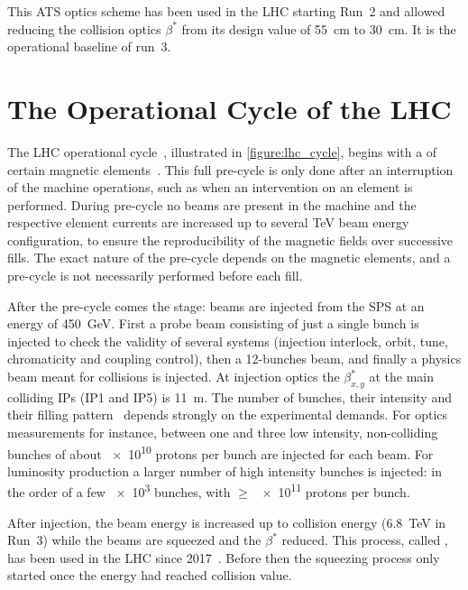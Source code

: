 This ATS optics scheme has been used in the LHC starting Run~\num{2} and allowed reducing the collision optics \(\beta^{\ast}\) from its design value of \qty{55}{\centi\meter} to \qty{30}{\centi\meter}.
It is the operational baseline of \Gls{run}~\num{3}.

\section{The Operational Cycle of the LHC}
\label{section:lhc_operational_cycle}

The \gls{LHC} operational cycle~\cite{Report:LHCModes}, illustrated in \cref{figure:lhc_cycle}, begins with a  of certain magnetic elements~\cite{Report:LHCMagnetsPreCycles}.
This full pre-cycle is only done after an interruption of the machine operations, such as when an intervention on an element is performed.
During pre-cycle no beams are present in the machine and the respective element currents are increased up to several \unit{\tera\electronvolt} beam energy configuration, to ensure the reproducibility of the magnetic fields over successive fills.
The exact nature of the pre-cycle depends on the magnetic elements, and a pre-cycle is not necessarily performed before each fill.

After the pre-cycle comes the  stage: beams are injected from the \gls{SPS} at an energy of \qty{450}{\giga\electronvolt}.
First a probe beam consisting of just a single bunch is injected to check the validity of several systems (injection interlock, orbit, tune, chromaticity and coupling control), then a \num{12}-bunches beam, and finally a physics beam meant for collisions is injected.
At injection optics the \(\beta^{\ast}_{x,y}\) at the main colliding \glspl{IP} (IP\num{1} and IP\num{5}) is \qty{11}{\metre}.
The number of bunches, their intensity and their filling pattern~\cite{Report:LHCStandardFillingSchemes} depends strongly on the experimental demands.
For \gls{optics} measurements for instance, between one and three low intensity, non-colliding bunches of about \num{e10} protons per bunch are injected for each beam.
For luminosity production a larger number of high intensity bunches is injected: in the order of a few \num{e3} bunches, with \(\ge\) \num{e11} protons per bunch.

After injection, the beam energy is increased up to collision energy (\qty{6.8}{\tera\electronvolt} in Run~3) while the beams are squeezed and the \(\beta^{\ast}\) reduced.
This process, called , has been used in the LHC since 2017~\cite{IPAC:Camillocci:CombinedRampAndSqueeze}.
Before then the squeezing process only started once the energy had reached collision value.

